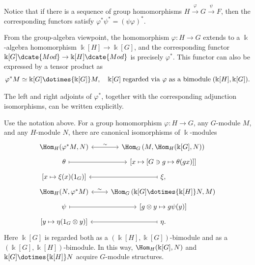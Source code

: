 Notice that if there is a sequence of group homomorphisms
$H\xrightarrow{\varphi}G\xrightarrow{\psi}F$, then the corresponding functors
satisfy $\varphi^*\psi^*=(\psi\varphi)^*$.

From the group-algebra viewpoint, the homomorphism $\varphi:H\to G$ extends to
a $\Bbbk$-algebra homomorphism $\Bbbk[H]\to\Bbbk[G]$, and the corresponding
functor $\Bbbk[G]\dcate{Mod}\to\Bbbk[H]\dcate{Mod}$ is precisely
$\varphi^*$. This functor can also be expressed by a tensor product as
\begin{equation}\label{eqn:G-module-pullback-tensor}
	\varphi^* M \simeq \Bbbk[G] \dotimes{\Bbbk[G]} M, \quad \Bbbk[G] \;\text{regarded via $\varphi$ as a bimodule}\; (\Bbbk[H], \Bbbk[G]).
\end{equation}

The left and right adjoints of $\varphi^*$, together with the corresponding
adjunction isomorphisms, can be written explicitly.

\begin{proposition}\label{prop:pullback-two-adjoint}
	Use the notation above. For a group homomorphism $\varphi:H\to G$, any
	$G$-module $M$, and any $H$-module $N$, there are canonical isomorphisms of
	$\Bbbk$-modules
	\[\begin{tikzcd}[row sep=tiny]
		\Hom_H(\varphi^* M, N) \arrow[leftrightarrow, r, "\sim"] & \Hom_G\left( M, \Hom_H(\Bbbk[G], N) \right) \\
		\theta \arrow[mapsto, r] & {[x \mapsto [G \ni g \mapsto \theta(gx)] ]} \\
		{[x \mapsto \xi(x)(1_G)]} & \xi, \arrow[mapsto, l] \\
		\Hom_H(N, \varphi^* M) \arrow[leftrightarrow, r, "\sim"] & \Hom_G\left( \Bbbk[G] \dotimes{\Bbbk[H]} N, M \right) \\
		\psi \arrow[mapsto, r] & {[g \otimes y \mapsto g\psi(y)]} \\
		{[y \mapsto \eta(1_G \otimes y) ]} & \eta \arrow[mapsto, l].
	 \end{tikzcd}\]
	Here $\Bbbk[G]$ is regarded both as a
	$(\Bbbk[H],\Bbbk[G])$-bimodule and as a
	$(\Bbbk[G],\Bbbk[H])$-bimodule. In this way,
	$\Hom_H(\Bbbk[G],N)$ and $\Bbbk[G]\dotimes{\Bbbk[H]}N$ acquire
	$G$-module structures.
\end{proposition}

